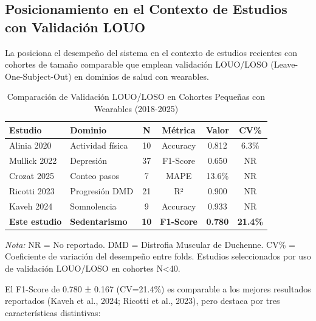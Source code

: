 \subsection{Posicionamiento en el Contexto de Estudios con Validación LOUO}
\label{subsec:comparativa_louo}

La  posiciona el desempeño del sistema en el contexto de estudios recientes con cohortes de tamaño comparable que emplean validación LOUO/LOSO (Leave-One-Subject-Out) en dominios de salud con wearables.

\begin{table}[htbp]
\centering
\caption{Comparación de Validación LOUO/LOSO en Cohortes Pequeñas con Wearables (2018-2025)}
\label{tab:comparativa_louo}
\small
\begin{tabular}{@{}llcccc@{}}
\toprule
\textbf{Estudio} & \textbf{Dominio} & \textbf{N} & \textbf{Métrica} & \textbf{Valor} & \textbf{CV\%} \\
\midrule
Alinia 2020 & Actividad física & 10 & Accuracy & 0.812 & 6.3\% \\
Mullick 2022 & Depresión & 37 & F1-Score & 0.650 & NR \\
Crozat 2025 & Conteo pasos & 7 & MAPE & 13.6\% & NR \\
Ricotti 2023 & Progresión DMD & 21 & R² & 0.900 & NR \\
Kaveh 2024 & Somnolencia & 9 & Accuracy & 0.933 & NR \\
\midrule
\textbf{Este estudio} & \textbf{Sedentarismo} & \textbf{10} & \textbf{F1-Score} & \textbf{0.780} & \textbf{21.4\%} \\
\bottomrule
\end{tabular}
\begin{flushleft}
\scriptsize
\textit{Nota:} NR = No reportado. DMD = Distrofia Muscular de Duchenne. CV\% = Coeficiente de variación del desempeño entre folds. Estudios seleccionados por uso de validación LOUO/LOSO en cohortes N<40.
\end{flushleft}
\end{table}

El F1-Score de 0.780 ± 0.167 (CV=21.4\%) es comparable a los mejores resultados reportados (Kaveh et al., 2024; Ricotti et al., 2023), pero destaca por tres características distintivas:

